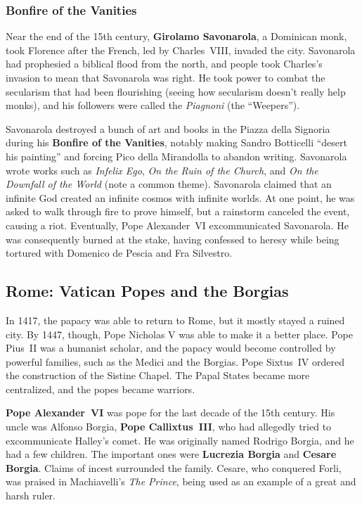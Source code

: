 \subsubsection*{Bonfire of the Vanities}

Near the end of the 15th century, \textbf{Girolamo Savonarola}, a Dominican monk,
took Florence after the French, led by Charles~VIII, invaded the city.
Savonarola had prophesied a biblical flood from the north,
and people took Charles's invasion to mean that Savonarola was right.
He took power to combat the secularism that had been flourishing (seeing how secularism doesn't really help monks),
and his followers were called the \textit{Piagnoni} (the ``Weepers'').

Savonarola destroyed a bunch of art and books in the Piazza della Signoria
during his \textbf{Bonfire of the Vanities},
notably making Sandro Botticelli ``desert his painting'' and forcing Pico della Mirandolla to abandon writing.
Savonarola wrote works such as
\textit{Infelix Ego},
\textit{On the Ruin of the Church},
and \textit{On the Downfall of the World} (note a common theme).
Savonarola claimed that an infinite God created an infinite cosmos with infinite worlds.
At one point, he was asked to walk through fire to prove himself, but a rainstorm canceled the event, causing a riot.
Eventually, Pope Alexander~VI excommunicated Savonarola.
He was consequently burned at the stake,
having confessed to heresy while being tortured with Domenico de Pescia and Fra Silvestro.

\subsection*{Rome: Vatican Popes and the Borgias}

In 1417, the papacy was able to return to Rome, but it mostly stayed a ruined city.
By 1447, though, Pope Nicholas V was able to make it a better place.
Pope Pius~II was a humanist scholar, and the papacy would become controlled by powerful families,
such as the Medici and the Borgias.
Pope Sixtus~IV ordered the construction of the Sistine Chapel.
The Papal States became more centralized, and the popes became warriors.

\textbf{Pope Alexander~VI} was pope for the last decade of the 15th century.
His uncle was Alfonso Borgia, \textbf{Pope Callixtus~III},
who had allegedly tried to excommunicate Halley's comet.
He was originally named Rodrigo Borgia, and he had a few children.
The important ones were \textbf{Lucrezia Borgia} and \textbf{Cesare Borgia}.
Claims of incest surrounded the family.
Cesare, who conquered Forli, was praised in Machiavelli's \textit{The Prince},
being used as an example of a great and harsh ruler.

